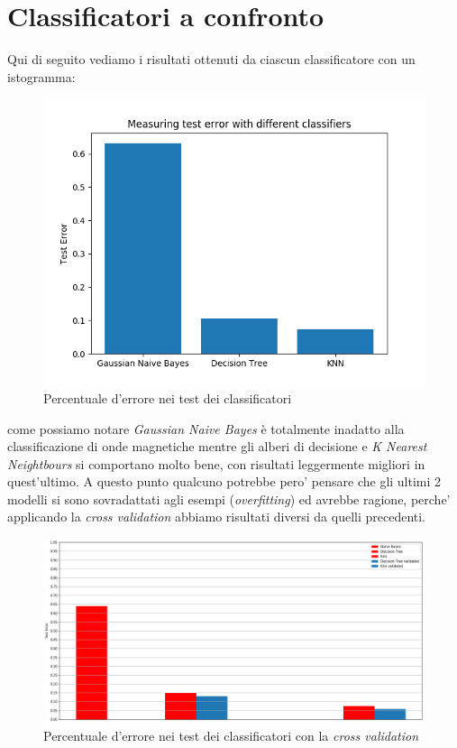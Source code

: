 \section{Classificatori a confronto}
Qui di seguito vediamo i risultati ottenuti da ciascun classificatore con un istogramma:

\begin{figure}[H]
	\centering
	\includegraphics[width=0.7\linewidth]{img/test_errors}
	\caption{Percentuale d'errore nei test dei classificatori}
	\label{fig:testerrors}
\end{figure}

come possiamo notare \textit{Gaussian Naive Bayes} \`e totalmente inadatto alla classificazione di onde magnetiche mentre gli alberi di decisione e \textit{K Nearest Neightbours} si comportano molto bene, con risultati leggermente migliori in quest'ultimo.
A questo punto qualcuno potrebbe pero' pensare che gli ultimi 2 modelli si sono sovradattati agli esempi (\textit{overfitting}) ed avrebbe ragione, perche' applicando la \textit{cross validation} abbiamo risultati diversi da quelli precedenti.

\begin{figure}[H]
	\centering
	\includegraphics[width=1\linewidth]{img/test_errors_cross_validation}
	\caption{Percentuale d'errore nei test dei classificatori con la \textit{cross validation}}
	\label{fig:testerrorscrossvalidation}
\end{figure}


